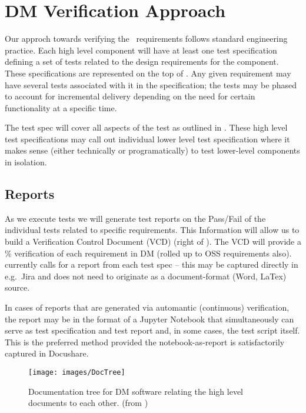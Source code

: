 \section{DM Verification Approach \label{sect:approach}}

Our approch towards verifying the \product\ requirements follows
standard engineering practice.  Each high level component will have at
least one test specification defining a set of tests related to the
design requirements for the component.  These specifications are
represented on the top of . Any given requirement
may have several tests associated with it in the specification; the
tests may be phased to account for incremental delivery depending on
the need for certain functionality at a specific time.

The test spec will cover all aspects of the test as outlined in
. These high level test specifications may call
out individual lower level test specification where it makes sense
(either technically or programatically) to test lower-level components
in isolation.

\subsection{Reports}

As we execute tests we will generate test reports on the Pass/Fail of the individual tests related to specific requirements.
This Information will allow us to build a Verification Control Document (VCD) (right of ).
The VCD will provide a \% verification of each requirement in DM (rolled up to OSS requirements also).
 currently calls for a report from each test spec -- this may be captured directly in e.g.\ Jira and does not need to originate as a document-format (Word, LaTex) source.

In cases of reports that are generated via automantic (continuous) verification, the report may be in the format of a Jupyter Notebook that simultaneously can serve as test specification and test report and, in some cases, the test script itself. This is the preferred method provided the notebook-as-report is satisfactorily captured in Docushare.


\begin{figure}
\begin{center}
 \texttt{[image: images/DocTree]}
 \caption{Documentation tree for DM software relating the high level documents to each other. (from )\label{fig:doctree}}

 \end{center}
 \end{figure}

